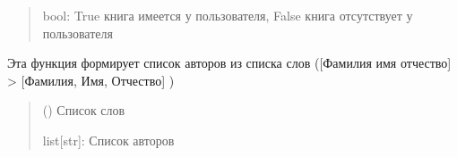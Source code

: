 \documentclass[letterpaper,10pt,russian]{sphinxmanual}
\begin{document}
\begin{fulllineitems}
\begin{description}
\begin{quote}
\begin{description}
\end{description}\end{quote}

\end{description}
\begin{quote}\begin{description}
\sphinxAtStartPar
bool: True \sphinxhyphen{} книга имеется у пользователя, False \sphinxhyphen{} книга отсутствует у пользователя

\end{description}\end{quote}

\end{fulllineitems}


\begin{fulllineitems}
\label{\detokenize{blueprints:blueprints.function.formation_authors}}
\pysigstartsignatures
{}
\pysigstopsignatures
\sphinxAtStartPar
Эта функция формирует список авторов из списка слов ({[}Фамилия имя отчество{]} \sphinxhyphen{}\textgreater{} {[}Фамилия, Имя, Отчество{]} )
\begin{quote}\begin{description}
\sphinxAtStartPar
{} (\sphinxstyleliteralemphasis{\sphinxupquote{{[}}}\sphinxstyleliteralemphasis{\sphinxupquote{{]}}}) \textendash{} Список слов

\sphinxAtStartPar
list{[}str{]}: Список авторов

\end{description}\end{quote}

\end{fulllineitems}

\end{document}
